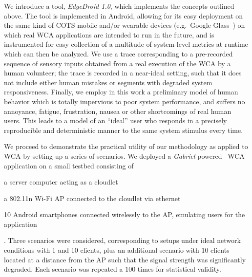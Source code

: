 We introduce a tool, \emph{EdgeDroid \num{1.0}}, which implements the concepts outlined above.
The tool is implemented in Android, allowing for its easy deployment on the same kind of \gls{COTS} mobile and/or wearable devices (e.g.\ Google Glass~\cite{googleglass}) on which real \gls{WCA} applications are intended to run in the future, and is instrumented for easy collection of a multitude of system-level metrics at runtime which can then be analyzed.
We use a trace corresponding to a pre-recorded sequence of sensory inputs obtained from a real execution of the \gls{WCA} by a human volunteer;
the trace is recorded in a near-ideal setting, such that it does not include either human mistakes or segments with degraded system responsiveness.
Finally, we employ in this work a preliminary model of human behavior which is totally impervious to poor system performance, and suffers no annoyance, fatigue, frustration, nausea or other shortcomings of real human users.
This leads to a model of an ``ideal'' user who responds in a precisely reproducible and deterministic manner to the same system stimulus every time.

\medskip
We proceed to demonstrate the practical utility of our methodology as applied to \gls{WCA} by setting up a series of scenarios.
We deployed a \emph{Gabriel}-powered~\cite{chen2018application} \gls{WCA} application on a small testbed consisting of
\begin{inlineenum}
    \item a server computer acting as a cloudlet
    \item a 802.11n Wi-Fi \gls{AP} connected to the cloudlet via ethernet
    \item \num{10} Android smartphones connected wirelessly to the \gls{AP}, emulating users for the application
\end{inlineenum}.
Three scenarios were considered, corresponding to setups under ideal network conditions with \num{1} and \num{10} clients, plus an additional scenario with \num{10} clients located at a distance from the \gls{AP} such that the signal strength was significantly degraded.
Each scenario was repeated a \num{100} times for statistical validity.

